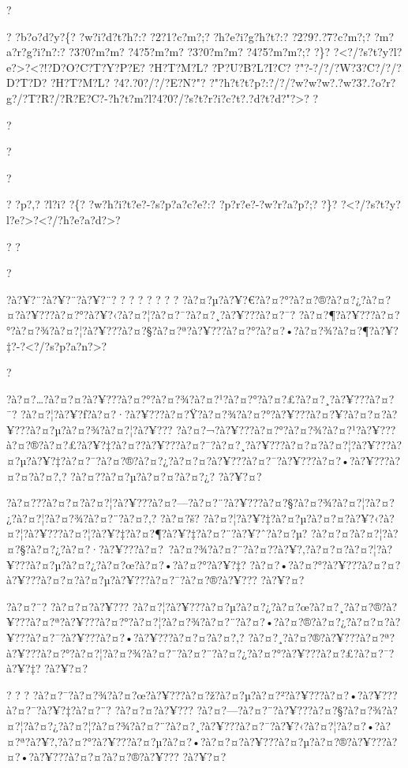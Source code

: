\documentclass[11pt, openany]{book}
\begin{document}
{{{{{{{{{{{{{{{{{{?

? ?b?o?d?y?\{? ?w?i?d?t?h?:? ?2?1?c?m?;? ?h?e?i?g?h?t?:? ?2?9?.?7?c?m?;?
?m?a?r?g?i?n?:? ?3?0?m?m? ?4?5?m?m? ?3?0?m?m? ?4?5?m?m?;? ?\}?
?\textless{}?/?s?t?y?l?e?\textgreater{}?\textless{}?!?D?O?C?T?Y?P?E?
?H?T?M?L? ?P?U?B?L?I?C? ?"?-?/?/?W?3?C?/?/?D?T?D? ?H?T?M?L?
?4?.?0?/?/?E?N?"?
?"?h?t?t?p?:?/?/?w?w?w?.?w?3?.?o?r?g?/?T?R?/?R?E?C?-?h?t?m?l?4?0?/?s?t?r?i?c?t?.?d?t?d?"?\textgreater{}?
?

?

?

?

? ?p?,? ?l?i? ?\{? ?w?h?i?t?e?-?s?p?a?c?e?:? ?p?r?e?-?w?r?a?p?;? ?\}?
?\textless{}?/?s?t?y?l?e?\textgreater{}?\textless{}?/?h?e?a?d?\textgreater{}?

? ?

?

?à?¥?¨?à?¥?¨?à?¥?¨? ? ? ? ? ? ? ?
?à?¤?µ?à?¥?€?à?¤?°?à?¤?®?à?¤?¿?à?¤?¤?à?¥???à?¤?°?à?¥?‹?à?¤?¦?à?¤?¯?à?¤?¸?à?¥???à?¤?¯?
?à?¤?¶?à?¥???à?¤?°?à?¤?¾?à?¤?¦?à?¥???à?¤?§?à?¤?ª?à?¥???à?¤?°?à?¤?•?à?¤?¾?à?¤?¶?à?¥?‡?-?\textless{}?/?s?p?a?n?\textgreater{}?

?

?à?¤?\ldots{}?à?¤?¤?à?¥???à?¤?°?à?¤?¾?à?¤?¹?à?¤?°?à?¤?£?à?¤?¸?à?¥???à?¤?¯?
?à?¤?¦?à?¥?ƒ?à?¤?·?à?¥???à?¤?Ÿ?à?¤?¾?à?¤?°?à?¥???à?¤?¥?à?¤?¤?à?¥???à?¤?µ?à?¤?¾?à?¤?¦?à?¥???
?à?¤?¬?à?¥???à?¤?°?à?¤?¾?à?¤?¹?à?¥???à?¤?®?à?¤?£?à?¥?‡?à?¤?­?à?¥???à?¤?¯?à?¤?¸?à?¥???à?¤?¤?à?¤?¦?à?¥???à?¤?µ?à?¥?‡?à?¤?¯?à?¤?®?à?¤?¿?à?¤?¤?à?¥???à?¤?¯?à?¥???à?¤?•?à?¥???à?¤?¤?à?¤?‚?
?à?¤?­?à?¤?µ?à?¤?¤?à?¤?¿? ?à?¥?¤?

?à?¤???à?¤?¤?à?¤?¦?à?¥???à?¤?---?à?¤?¨?à?¥???à?¤?§?à?¤?¾?à?¤?¦?à?¤?¿?à?¤?¦?à?¤?¾?à?¤?¨?à?¤?‚?
?à?¤?š?
?à?¤?¦?à?¥?‡?à?¤?µ?à?¤?¤?à?¥?‹?à?¤?¦?à?¥???à?¤?¦?à?¥?‡?à?¤?¶?à?¥?‡?à?¤?¨?à?¥?ˆ?à?¤?µ?
?à?¤?¤?à?¤?¦?à?¤?§?à?¤?¿?à?¤?·?à?¥???à?¤?~?à?¤?¾?à?¤?¨?à?¤?­?à?¥?‚?à?¤?¤?à?¤?¦?à?¥???à?¤?µ?à?¤?¿?à?¤?œ?à?¤?•?à?¤?°?à?¥?‡?
?à?¤?•?à?¤?°?à?¥???à?¤?¤?à?¥???à?¤?¤?à?¤?µ?à?¥???à?¤?¯?à?¤?®?à?¥???
?à?¥?¤?

?à?¤?¨? ?à?¤?¤?à?¥???
?à?¤?¦?à?¥???à?¤?µ?à?¤?¿?à?¤?œ?à?¤?¸?à?¤?®?à?¥???à?¤?ª?à?¥???à?¤?°?à?¤?¦?à?¤?¾?à?¤?¨?à?¤?•?à?¤?®?à?¤?¿?à?¤?¤?à?¥???à?¤?¯?à?¥???à?¤?•?à?¥???à?¤?¤?à?¤?‚?
?à?¤?¸?à?¤?®?à?¥???à?¤?ª?à?¥???à?¤?°?à?¤?¦?à?¤?¾?à?¤?¨?à?¤?¨?à?¤?¿?à?¤?°?à?¥???à?¤?£?à?¤?¯?à?¥?‡?
?à?¥?¤?

? ? ?
?à?¤?¯?à?¤?¾?à?¤?œ?à?¥???à?¤?ž?à?¤?µ?à?¤?²?à?¥???à?¤?•?à?¥???à?¤?¯?à?¥?‡?à?¤?¨?
?à?¤?¤?à?¥???
?à?¤?---?à?¤?¨?à?¥???à?¤?§?à?¤?¾?à?¤?¦?à?¤?¿?à?¤?¦?à?¤?¾?à?¤?¨?à?¤?¸?à?¥???à?¤?¯?à?¥?‹?à?¤?¦?à?¤?•?à?¤?ª?à?¥?‚?à?¤?°?à?¥???à?¤?µ?à?¤?•?à?¤?¤?à?¥???à?¤?µ?à?¤?®?à?¥???à?¤?•?à?¥???à?¤?¤?à?¤?®?à?¥???
?à?¥?¤?

}}}}}}}}}}}}}}}}}}
\end{document}

